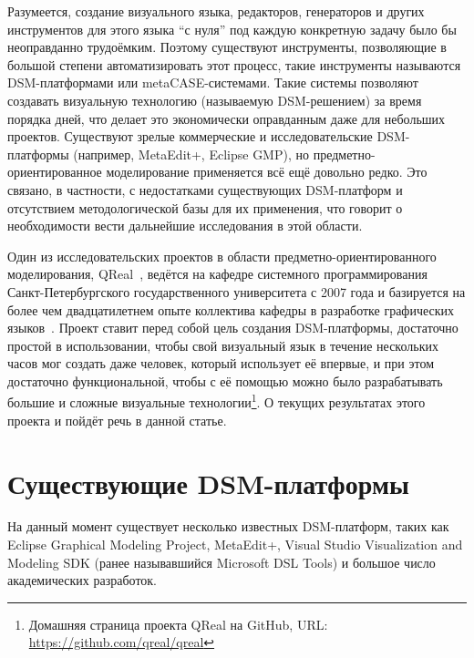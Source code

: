 \documentclass[a4, 12pt]{article}
\begin{document}
Разумеется, создание визуального языка, редакторов, генераторов и других инструментов для этого языка “с нуля” под каждую конкретную задачу было бы неоправданно трудоёмким. Поэтому существуют инструменты, позволяющие в большой степени автоматизировать этот процесс, такие инструменты называются DSM-платформами или metaCASE-системами. Такие системы позволяют создавать визуальную технологию (называемую DSM-решением) за время порядка дней, что делает это экономически оправданным даже для небольших проектов. Существуют зрелые коммерческие и исследовательские DSM-платформы (например, MetaEdit+, Eclipse GMP), но предметно-ориентированное моделирование применяется всё ещё довольно редко. Это связано, в частности, с недостатками существующих DSM-платформ и отсутствием методологической базы для их применения, что говорит о необходимости вести дальнейшие исследования в этой области.

Один из исследовательских проектов в области предметно-ориентированного моделирования, QReal~\cite{qreal2, qreal1}, ведётся на кафедре системного программирования Санкт-Петербургского государственного университета с 2007 года и базируется на более чем двадцатилетнем опыте коллектива кафедры в разработке графических языков~\cite{rtst1, rtst2, rtst4, rtst3, asu, rtst5}. Проект ставит перед собой цель создания DSM-платформы, достаточно простой в использовании, чтобы свой визуальный язык в течение нескольких часов мог создать даже человек, который использует её впервые, и при этом достаточно функциональной, чтобы с её помощью можно было разрабатывать большие и сложные визуальные технологии\footnote{Домашняя страница проекта QReal на GitHub, URL: \url{https://github.com/qreal/qreal}}. О текущих результатах этого проекта и пойдёт речь в данной статье.

\section{Существующие DSM-платформы}

На данный момент существует несколько известных DSM-платформ, таких как Eclipse Graphical Modeling Project, MetaEdit+, Visual Studio Visualization and Modeling SDK (ранее называвшийся Microsoft DSL Tools) и большое число академических разработок. 
\end{document}
